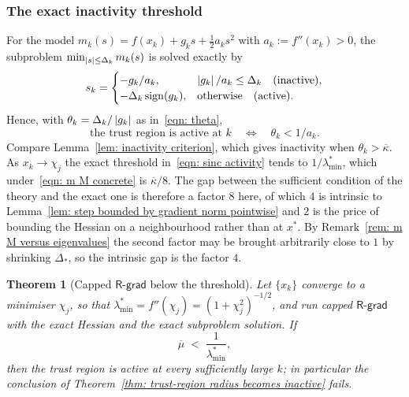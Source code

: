 \documentclass[11pt]{article}
\theoremstyle{plain}
\newtheorem{theorem}{Theorem}[section]
\theoremstyle{definition}
\theoremstyle{remark}
\numberwithin{equation}{section}
\providecommand{\defeq}{\mathrel{:=}}
\newcommand{\Rgrad}{\textsf{R-grad}}
\providecommand{\kbar}{\overline{\kappa}}
\providecommand{\kbar}{\overline{\kappa}}
\begin{document}
\subsubsection{The exact inactivity threshold}

For the model $m_k(s) = f(x_k) + g_k s + \tfrac12 a_k s^2$ with $a_k \defeq f''(x_k) > 0$, the
subproblem $\min_{\left \vert s \right \vert\leq\Delta_k} m_k(s)$ is solved exactly by
\begin{equation}
    s_k = \begin{cases}
        -g_k/a_k , & \left \vert g_k \right \vert/a_k \leq \Delta_k \quad\text{(inactive)} ,\\
        -\Delta_k\operatorname{sign}(g_k) , & \text{otherwise} \quad\text{(active)} .
    \end{cases}
    \label{eqn: sinc 1d step}
\end{equation}
Hence, with $\theta_k = \Delta_k/\left \vert g_k \right \vert$ as in~\eqref{eqn: theta},
\begin{equation}
    \text{the trust region is active at } k
    \quad\Longleftrightarrow\quad
    \theta_k < 1/a_k .
    \label{eqn: sinc activity}
\end{equation}
Compare Lemma~\ref{lem: inactivity criterion}, which gives inactivity when $\theta_k > \kbar$. As
$x_k \to \chi_j$ the exact threshold in~\eqref{eqn: sinc activity} tends to $1/\lambda^*_{\min}$,
which under~\eqref{eqn: m M concrete} is $\kbar/8$. The gap between the sufficient condition of
the theory and the exact one is therefore a factor $8$ here, of which $4$ is intrinsic to
Lemma~\ref{lem: step bounded by gradient norm pointwise} and $2$ is the price of bounding the
Hessian on a neighbourhood rather than at $x^*$. By
Remark~\ref{rem: m M versus eigenvalues} the second factor may be brought arbitrarily close to
$1$ by shrinking $\Delta_*$, so the intrinsic gap is the factor $4$.

\begin{theorem}[Capped $\Rgrad$ below the threshold]
\label{thm: sinc rgrad}
    Let $\{x_k\}$ converge to a minimiser $\chi_j$, so that
    $\lambda^*_{\min} = f''(\chi_j) = (1+\chi_j^2)^{-1/2}$, and run capped $\Rgrad$ with the exact
    Hessian and the exact subproblem solution. If
    \begin{equation}
        \overline{\mu} \;<\; \frac{1}{\lambda^*_{\min}} ,
        \label{eqn: sinc mu threshold}
    \end{equation}
    then the trust region is active at \emph{every} sufficiently large $k$; in particular the
    conclusion of Theorem~\ref{thm: trust-region radius becomes inactive} fails.
\end{theorem}
\end{document}
